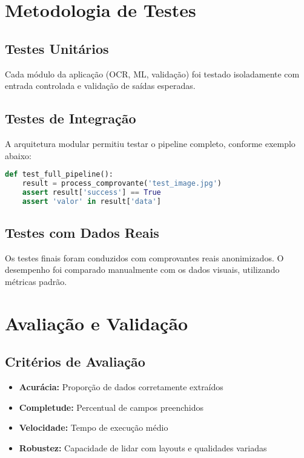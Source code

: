 \section{Metodologia de Testes}

\subsection{Testes Unitários}

Cada módulo da aplicação (OCR, ML, validação) foi testado isoladamente com entrada controlada e validação de saídas esperadas.

\subsection{Testes de Integração}

A arquitetura modular permitiu testar o pipeline completo, conforme exemplo abaixo:

\begin{lstlisting}[language=Python]
def test_full_pipeline():
    result = process_comprovante('test_image.jpg')
    assert result['success'] == True
    assert 'valor' in result['data']
\end{lstlisting}

\subsection{Testes com Dados Reais}

Os testes finais foram conduzidos com comprovantes reais anonimizados. O desempenho foi comparado manualmente com os dados visuais, utilizando métricas padrão.

\section{Avaliação e Validação}

\subsection{Critérios de Avaliação}

\begin{itemize}
    \item \textbf{Acurácia:} Proporção de dados corretamente extraídos
    \item \textbf{Completude:} Percentual de campos preenchidos
    \item \textbf{Velocidade:} Tempo de execução médio
    \item \textbf{Robustez:} Capacidade de lidar com layouts e qualidades variadas
\end{itemize}

